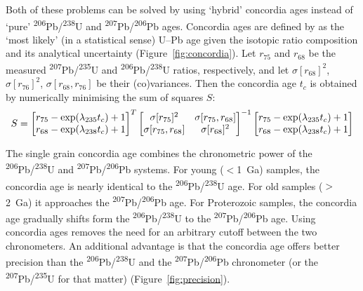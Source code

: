 \documentclass[gchron, manuscript]{copernicus}
\begin{document}
Both of these problems can be solved by using `hybrid' concordia ages
instead of `pure' \textsuperscript{206}Pb/\textsuperscript{238}U and
\textsuperscript{207}Pb/\textsuperscript{206}Pb ages. Concordia ages
are defined by \citet{ludwig1998} as the `most likely' (in a
statistical sense) U--Pb age given the isotopic ratio composition and
its analytical uncertainty (Figure~\ref{fig:concordia}).  Let $r_{75}$
and $r_{68}$ be the measured
\textsuperscript{207}Pb/\textsuperscript{235}U and
\textsuperscript{206}Pb/\textsuperscript{238}U ratios, respectively,
and let $\sigma[r_{68}]^2$, $\sigma[r_{76}]^2$,
$\sigma[r_{68},r_{76}]$ be their (co)variances.  Then the concordia
age $t_c$ is obtained by numerically minimising the sum of squares
$S$:
\begin{equation}
  S = \left[
    \begin{array}{@{}c@{}}
      r_{75} - \exp(\lambda_{235}t_c) + 1 \\
      r_{68} - \exp(\lambda_{238}t_c) + 1
    \end{array}
    \right]^T\left[
    \begin{array}{@{}cc@{}}
      \sigma[r_{75}]^2 & \sigma[r_{75},r_{68}] \\
      \sigma[r_{75},r_{68}] & \sigma[r_{68}]^2
    \end{array}
    \right]^{-1}
  \left[
    \begin{array}{@{}c@{}}
      r_{75} - \exp(\lambda_{235}t_c) + 1 \\
      r_{68} - \exp(\lambda_{238}t_c) + 1      
    \end{array}
    \right]
  \label{eq:S}
\end{equation}

The single grain concordia age combines the chronometric power of the
\textsuperscript{206}Pb/\textsuperscript{238}U and
\textsuperscript{207}Pb/\textsuperscript{206}Pb systems. For young
($<$1~Ga) samples, the concordia age is nearly identical to the
\textsuperscript{206}Pb/\textsuperscript{238}U age. For old samples
($>$2~Ga) it approaches the
\textsuperscript{207}Pb/\textsuperscript{206}Pb age. For Proterozoic
samples, the concordia age gradually shifts form the
\textsuperscript{206}Pb/\textsuperscript{238}U to the
\textsuperscript{207}Pb/\textsuperscript{206}Pb age. Using concordia
ages removes the need for an arbitrary cutoff between the two
chronometers. An additional advantage is that the concordia age offers
better precision than the
\textsuperscript{206}Pb/\textsuperscript{238}U and the
\textsuperscript{207}Pb/\textsuperscript{206}Pb chronometer (or the
\textsuperscript{207}Pb/\textsuperscript{235}U for that matter)
(Figure~\ref{fig:precision}).
\end{document}
